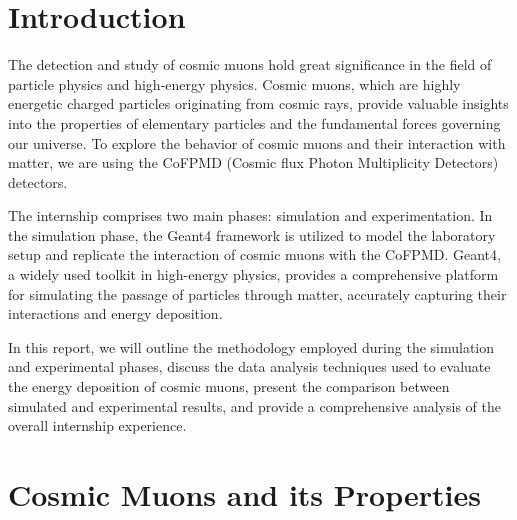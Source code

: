 \documentclass{article}
\begin{document}
\newpage
\begin{multicols}{2}



\section{Introduction}

The detection and study of cosmic muons hold great significance in the field of particle physics 
and high-energy physics. Cosmic muons, which are highly energetic charged particles originating from 
cosmic rays, provide valuable insights into the properties of elementary particles and the fundamental 
forces governing our universe. To explore the behavior of cosmic muons and their interaction with matter, 
we are using the CoFPMD (Cosmic flux Photon Multiplicity Detectors) detectors. 


The internship comprises two main phases: simulation and experimentation. In the 
simulation phase, the Geant4 framework is utilized to model the laboratory setup 
and replicate the interaction of cosmic muons with the CoFPMD. Geant4, a 
widely used toolkit in high-energy physics, provides a comprehensive platform for 
simulating the passage of particles through matter, accurately capturing their interactions 
and energy deposition.


In this report, we will outline the methodology employed during the simulation and 
experimental phases, discuss the data analysis techniques used to evaluate the energy 
deposition of cosmic muons, present the comparison between simulated and experimental 
results, and provide a comprehensive analysis of the overall internship experience.







\section{Cosmic Muons and its Properties}




\end{multicols}
\end{document}
